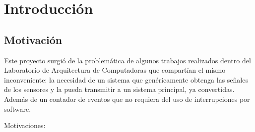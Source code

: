 \chapter{Introducción} %
\label{cha:introduccion}

\section{Motivación} %
\label{sec:motivacion}

Este proyecto surgió de la problemática de algunos trabajos realizados dentro del Laboratorio de Arquitectura de Computadoras que compartían el mismo inconveniente: la necesidad de un sistema que genéricamente obtenga las señales de los sensores y la pueda transmitir a un sistema principal, ya convertidas. Además de un contador de eventos que no requiera del uso de interrupciones por software.

Motivaciones: 

